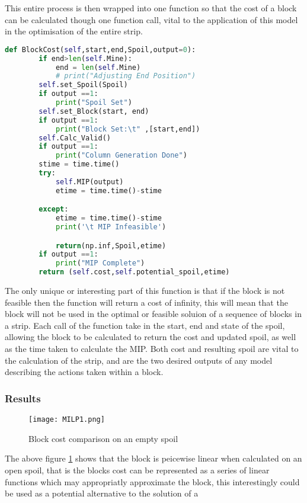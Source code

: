 This entire process is then wrapped into one function so that the cost of a block can be calculated though one function call, vital to the application of this model in the optimisation of the entire strip. 
\begin{lstlisting}[language=python]
	def BlockCost(self,start,end,Spoil,output=0):
		if end>len(self.Mine):
			end = len(self.Mine)
			# print("Adjusting End Position")
		self.set_Spoil(Spoil)
		if output ==1:
			print("Spoil Set")
		self.set_Block(start, end)
		if output ==1:
			print("Block Set:\t" ,[start,end])
		self.Calc_Valid()
		if output ==1:
			print("Column Generation Done")
		stime = time.time()
		try:
			self.MIP(output)
			etime = time.time()-stime

		except:
			etime = time.time()-stime
			print('\t MIP Infeasible')

			return(np.inf,Spoil,etime)
		if output ==1:
			print("MIP Complete")
		return (self.cost,self.potential_spoil,etime)
		\end{lstlisting}
The only unique or interesting part of this function is that if the block is not feasible then the function will return a cost of infinity, this will mean that the block will not be used in the optimal or feasible soluion of a sequence of blocks in a strip. Each call of the function take in the start, end and state of the spoil, allowing the block to be calculated to return the cost and updated spoil, as well as the time taken to calculate the MIP. Both cost and resulting spoil are vital to the calculation of the strip, and are the two desired outputs of any model describing the actions taken within a block. 
\subsubsection{Results}
\begin{figure}[h]
\caption{Block cost comparison on an empty spoil}
\label{MIP1}
\texttt{[image: MILP1.png]}
\end{figure}
The above figure \ref{MIP1} shows that the block is peicewise linear when calculated on an open spoil, that is the blocks cost can be represented as a series of linear functions which may appropriatly approximate the block, this interestingly could be used as a potential alternative to the solution of a 

